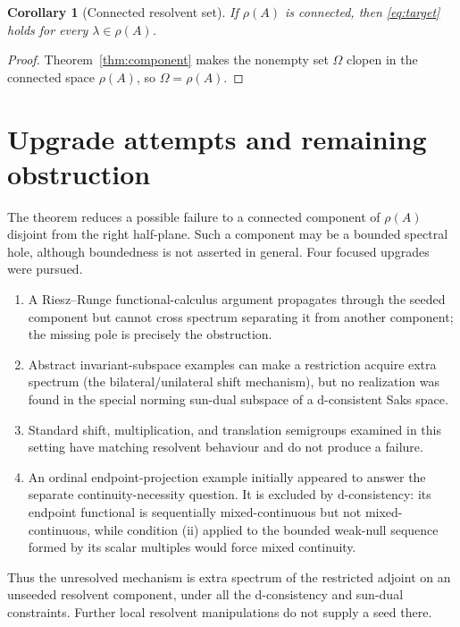 \documentclass[11pt]{article}
\newtheorem{corollary}{Corollary}
\begin{document}
\begin{corollary}[Connected resolvent set]
If \(\rho(A)\) is connected, then \eqref{eq:target} holds for every
\(\lambda\in\rho(A)\).
\end{corollary}

\begin{proof}
Theorem~\ref{thm:component} makes the nonempty set \(\Omega\) clopen in the
connected space \(\rho(A)\), so \(\Omega=\rho(A)\).
\end{proof}

\section{Upgrade attempts and remaining obstruction}

The theorem reduces a possible failure to a connected component of
\(\rho(A)\) disjoint from the right half-plane. Such a component may be a
bounded spectral hole, although boundedness is not asserted in general.
Four focused upgrades were pursued.

\begin{enumerate}
\item A Riesz--Runge functional-calculus argument propagates through the
seeded component but cannot cross spectrum separating it from another
component; the missing pole is precisely the obstruction.
\item Abstract invariant-subspace examples can make a restriction acquire
extra spectrum (the bilateral/unilateral shift mechanism), but no realization
was found in the special norming sun-dual subspace of a d-consistent Saks
space.
\item Standard shift, multiplication, and translation semigroups examined in
this setting have matching resolvent behaviour and do not produce a failure.
\item An ordinal endpoint-projection example initially appeared to answer the
separate continuity-necessity question. It is excluded by d-consistency: its
endpoint functional is sequentially mixed-continuous but not mixed-continuous,
while condition (ii) applied to the bounded weak-null sequence formed by its
scalar multiples would force mixed continuity.
\end{enumerate}

Thus the unresolved mechanism is extra spectrum of the restricted adjoint on
an unseeded resolvent component, under all the d-consistency and sun-dual
constraints. Further local resolvent manipulations do not supply a seed there.
\end{document}

